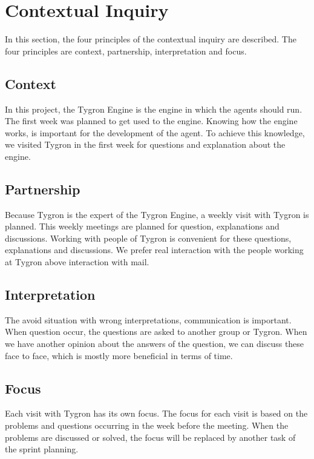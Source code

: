 \newpage

\section{Contextual Inquiry}
In this section, the four principles of the contextual inquiry are described. The four principles are context, partnership, interpretation and focus.

\subsection{Context}
In this project, the Tygron Engine is the engine in which the agents should run. The first week was planned to get used to the engine. Knowing how the engine works, is important for the development of the agent. To achieve this knowledge, we visited Tygron in the first week for questions and explanation about the engine.  

\subsection{Partnership}
Because Tygron is the expert of the Tygron Engine, a weekly visit with Tygron is planned. This weekly meetings are planned for question, explanations and discussions. Working with people of Tygron is convenient for these questions, explanations and discussions. We prefer real interaction with the people working at Tygron above interaction with mail.

\subsection{Interpretation}
The avoid situation with wrong interpretations, communication is important. When question occur, the questions are asked to another group or Tygron. When we have another opinion about the answers of the question, we can discuss these face to face, which is mostly more beneficial in terms of time. 

\subsection{Focus}
Each visit with Tygron has its own focus. The focus for each visit is based on the problems and questions occurring in the week before the meeting. When the problems are discussed or solved, the focus will be replaced by another task of the sprint planning. 

\newpage

